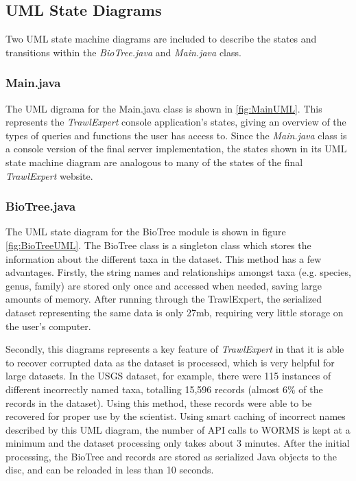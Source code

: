 \documentclass{article}
\begin{document}
\subsection{UML State Diagrams}
Two UML state machine diagrams are included to describe the states and transitions within the \textit{BioTree.java} and \textit{Main.java} class.

\subsubsection{Main.java}
The UML digrama for the Main.java class is shown in \ref{fig:MainUML}. This represents the \textit{TrawlExpert} console application's states, giving an overview of the types of queries and functions the user has access to. Since the \textit{Main.java} class is a console version of the final server implementation, the states shown in its UML state machine diagram are analogous to many of the states of the final \textit{TrawlExpert} website.
 
\subsubsection{BioTree.java}
The UML state diagram for the BioTree module is shown in figure \ref{fig:BioTreeUML}. The BioTree class is a singleton class which stores the information about the different taxa in the dataset. This method has a few advantages. Firstly, the string names and relationships amongst taxa (e.g. species, genus, family) are stored only once and accessed when needed, saving large amounts of memory. After running through the TrawlExpert, the serialized dataset representing the same data is only 27mb, requiring very little storage on the user's computer.

Secondly, this diagrams represents a key feature of \textit{TrawlExpert} in that it is able to recover corrupted data as the dataset is processed, which is very helpful for large datasets. In the USGS dataset, for example, there were 115 instances of different incorrectly named taxa, totalling 15,596 records (almost 6\% of the records in the dataset). Using this method, these records were able to be recovered for proper use by the scientist. Using smart caching of incorrect names described by this UML diagram, the number of API calls to WORMS is kept at a minimum and the dataset processing only takes about 3 minutes. After the initial processing, the BioTree and records are stored as serialized Java objects to the disc, and can be reloaded in less than 10 seconds.
\end{document}
